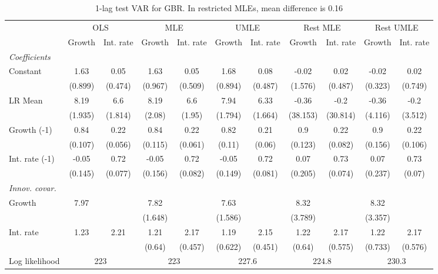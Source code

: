 \begin{table}[htbp] 
	\centering
	\begin{tabular}{@{\extracolsep{4pt}}lcccccccccc@{}}		\hline\hline
		 		 & \multicolumn{2}{c}{OLS} &\multicolumn{2}{c}{MLE} &\multicolumn{2}{c}{UMLE} &\multicolumn{2}{c}{Rest MLE} &\multicolumn{2}{c}{Rest UMLE} \\ 
 		 & Growth 	 & Int. rate 	 & Growth 	 & Int. rate 	 & Growth 	 & Int. rate 	 & Growth 	 & Int. rate 	 & Growth 	 & Int. rate\\\cline{2-3}\cline{4-5}\cline{6-7}\cline{8-9}\cline{10-11}
\rule{0pt}{4ex} 
 \emph{Coefficients} 	  		 & 		 & 		 & 		 & 		 & 		 & 		 & 		 & 		 & 		 &\\ 
\quad Constant 	 & 1.63 	 & 0.05 	 & 1.63 	 & 0.05 	 & 1.68 	 & 0.08 	 & -0.02 	 & 0.02 	 & -0.02 	 & 0.02	 \\ 
 		 & (0.899) 	 & (0.474) 	 & (0.967) 	 & (0.509) 	 & (0.894) 	 & (0.487) 	 & (1.576) 	 & (0.487) 	 & (0.323) 	 & (0.749) 	 \\ 
\quad LR Mean 	 & 8.19 	 & 6.6 	 & 8.19 	 & 6.6 	 & 7.94 	 & 6.33 	 & -0.36 	 & -0.2 	 & -0.36 	 & -0.2	 \\ 
 		 & (1.935) 	 & (1.814) 	 & (2.08) 	 & (1.95) 	 & (1.794) 	 & (1.664) 	 & (38.153) 	 & (30.814) 	 & (4.116) 	 & (3.512) 	 \\ 
\quad Growth (-1) 	 &0.84 	 & 0.22 	 & 0.84 	 & 0.22 	 & 0.82 	 & 0.21 	 & 0.9 	 & 0.22 	 & 0.9 	 & 0.22	 \\ 
 		 & (0.107) 	 & (0.056) 	 & (0.115) 	 & (0.061) 	 & (0.11) 	 & (0.06) 	 & (0.123) 	 & (0.082) 	 & (0.156) 	 & (0.106) 	 \\ 
\quad Int. rate (-1) 	 &-0.05 	 & 0.72 	 & -0.05 	 & 0.72 	 & -0.05 	 & 0.72 	 & 0.07 	 & 0.73 	 & 0.07 	 & 0.73	 \\ 
 		 & (0.145) 	 & (0.077) 	 & (0.156) 	 & (0.082) 	 & (0.149) 	 & (0.081) 	 & (0.205) 	 & (0.074) 	 & (0.237) 	 & (0.07) 	 \\ 
\rule{0pt}{4ex} \emph{Innov. covar.}  	 & 	 & 	 & 	 & 	 & 	 & 	 & 	 & 	 & 	 &\\ 
\quad Growth 	 &7.97 	 &  	 & 7.82 	 &  	 & 7.63 	 &  	 & 8.32 	 &  	 & 8.32 	 & 	 \\ 
 		 &  	 &  	 & (1.648) 	 &  	 & (1.586) 	 &  	 & (3.789) 	 &  	 & (3.357) 	 &  	 \\ 
\quad Int. rate 	 &1.23 	 & 2.21 	 & 1.21 	 & 2.17 	 & 1.19 	 & 2.15 	 & 1.22 	 & 2.17 	 & 1.22 	 & 2.17	 \\ 
 		 &  	 &  	 & (0.64) 	 & (0.457) 	 & (0.622) 	 & (0.451) 	 & (0.64) 	 & (0.575) 	 & (0.733) 	 & (0.576) 	 \\ 
 \hline \rule{0pt}{4ex} 
  Log likelihood 	 &\multicolumn{2}{c}{223} 	 & \multicolumn{2}{c}{223} 	 & \multicolumn{2}{c}{227.6} 	 & \multicolumn{2}{c}{224.8} 	 & \multicolumn{2}{c}{230.3}\\ 

 \hline 	\end{tabular}		\caption{1-lag test VAR for GBR. In restricted MLEs, mean difference is 0.16}
		\label{tab:GBR1lag}

\end{table}